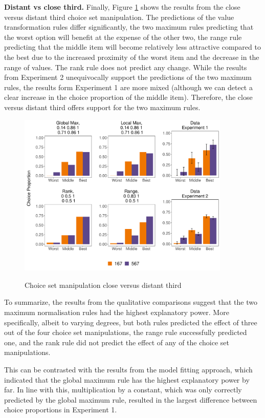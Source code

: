 \documentclass[11pt,a4paper]{article}
\begin{document}
\textbf{Distant vs close third.} Finally, Figure \ref{fig:closedist3rd_all} shows the results from the close versus distant third choice set manipulation. The predictions of the value transformation rules differ significantly, the two maximum rules predicting that the worst option will benefit at the expense of the other two, the range rule predicting that the middle item will become relatively less attractive compared to the best due to the increased proximity of the worst item and the decrease in the range of values. The rank rule does not predict any change.  While the results from Experiment 2 unequivocally support the predictions of the two maximum rules, the results form Experiment 1 are more mixed (although we can detect a clear increase in the choice proportion of the  middle item). Therefore, the close versus distant third offers support for the two maximum rules.

\begin{figure}[!htb]
\captionsetup{justification=centering}
\centering
\caption{Choice set manipulation close versus distant third}
\includegraphics[width=0.9\textwidth]{closedistthird.pdf}
\label{fig:closedist3rd_all}
\end{figure}


To summarize, the results from the qualitative comparisons suggest that the two maximum normalisation rules had the highest explanatory power. More specifically, albeit to varying degrees, but both rules predicted the effect of three out of the four choice set manipulations, the range rule successfully predicted one, and the rank rule did not predict the effect of any of the choice set manipulations.

This can be contrasted with the results from the model fitting approach, which indicated that the global maximum rule has the highest explanatory power by far. In line with this, multiplication by a constant, which was only correctly predicted by the global maximum rule, resulted in the largest difference between choice proportions in Experiment 1.
\end{document}
